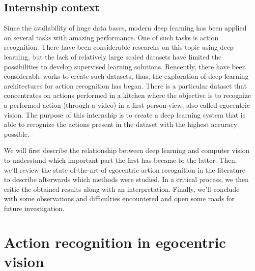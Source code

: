 \documentclass[12pt, a4paper]{report}
\begin{document}
		\section{Internship context}
			Since the availability of huge data bases, modern deep learning has been applied on several tasks with amazing performance.
			One of such tasks is action recognition.
			There have been considerable researchs on this topic using deep learning, but the lack of relatively large scaled datasets have limited the possibilities to develop supervised learning solutions.
			Rencently, there have been considerable works to create such datasets, thus, the exploration of deep learning architectures for action recognition has began.
			There is a particular dataset that concentrates on actions performed in a kitchen where the objective is to recognize a performed action (through a video) in a first person view, also called egocentric vision.
			The purpose of this internship is to create a deep learning system that is able to recognize the actions present in the dataset with the highest accuracy possible.
			\par
			\bigbreak
			We will first describe the relationship between deep learning and computer vision to understand which important part the first has became to the latter.
			Then, we'll review the state-of-the-art of egocentric action recognition in the literature to describe afterwards which methods were studied.
			In a critical process, we then critic the obtained results along with an interpretation.
			Finally, we'll conclude with some observations and difficulties encountered and open some roads for future investigation.
	\chapter{Action recognition in egocentric vision}
\end{document}
